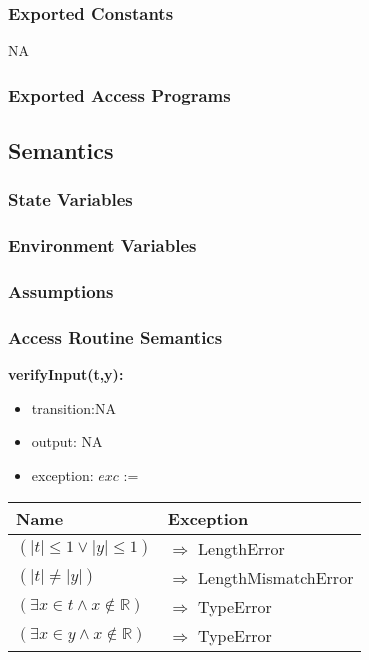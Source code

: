 \documentclass[12pt, titlepage]{article}
\begin{document}
\subsubsection{Exported Constants}

NA

\subsubsection{Exported Access Programs} 

\subsection{Semantics}

\subsubsection{State Variables}

\subsubsection{Environment Variables} 

\subsubsection{Assumptions}

\subsubsection{Access Routine Semantics}

\noindent \textbf{verifyInput(t,y):}
\begin{itemize}
\item transition:NA
\item output: NA
\item exception: $exc$ := 
\end{itemize}

\begin{tabular}{p{10cm} p{6.75cm}}
	
	\toprule
	\textbf{Name}&\textbf{Exception}\\
	\midrule


$ (|t| \leq 1 \lor |y| \leq 1)$ & $\Longrightarrow$ LengthError\\
$ (|t| \neq |y|)$ & $\Longrightarrow$ LengthMismatchError\\
$ (\exists x \in t \land  x \notin \mathbb{R} )$ & $\Longrightarrow$ TypeError\\
$ (\exists x \in y \land  x \notin \mathbb{R} )$ & $\Longrightarrow$ TypeError\\


\bottomrule
\end{tabular}\\
\end{document}
